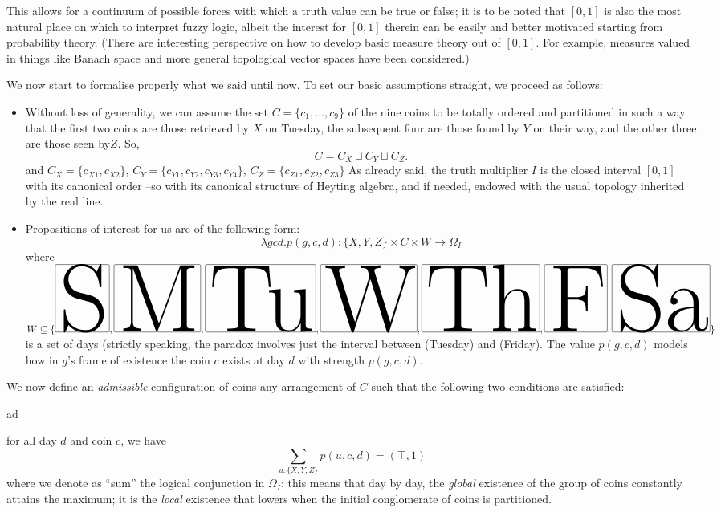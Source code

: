 \begin{example}
\begin{remark}
    This allows for a continuum of possible forces with which a truth value can be true or false;  it is to be noted that $[0,1]$ is also the most natural place on which to interpret fuzzy logic, albeit the interest for $[0,1]$ therein can be easily and better motivated starting from probability theory. (There are interesting perspective on how to develop basic measure theory out of $[0,1]$. For example, measures valued in things like Banach space and more general topological  vector spaces have been considered.)
  \end{remark}
  We now start to formalise properly what we said until now. To set our basic assumptions straight, we proceed as follows:
  \begin{itemize}
    \item Without loss of generality, we can assume the set $C = \{c_1,\dots,c_9\}$ of the nine coins to be totally ordered and partitioned in such a way that the first two coins are those retrieved by $X$ on Tuesday, the subsequent four are those found by $Y$ on their way, and the other three are those seen by$Z$. So,
          \[C = C_X \sqcup C_Y \sqcup C_Z.\]
          and $C_X = \{c_{X1}, c_{X2}\}$, $C_Y = \{c_{Y1},c_{Y2},c_{Y3},c_{Y4}\}$, $C_Z= \{c_{Z1}, c_{Z2}, c_{Z3}\}$ As already said, the truth multiplier $I$ is the closed interval $[0,1]$ with its canonical order --so with its canonical structure of Heyting algebra, and if needed, endowed with the usual topology inherited by the real line.
    \item Propositions of interest for us are of the following form:
          \[\lambda gcd.p(g, c, d) : \{X,Y,Z\}\times C\times W \to \Omega_I\]
          where $W \subseteq \{\S,\M,\Tu,\W, \Th,\F,\Sa\}$ is a set of days (strictly speaking, the paradox involves just the interval between \Tu (Tuesday) and \F (Friday). The value $p(g,c,d)$ models how in $g$'s frame of existence the coin $c$ exists at day $d$ with strength $p(g,c,d)$.
  \end{itemize}
  \begin{definition}
    We now define an \emph{admissible} configuration of coins any arrangement of $C$ such that the following two conditions are satisfied:
    \begin{enumtag}{ad}
      \item \label{ad:uno} for all day $d$ and coin $c$, we have
      \[
        \sum_{u: \{X,Y,Z\}} p(u,c,d) = (\top, 1)
      \]
      where we denote as ``sum'' the logical conjunction in $\Omega_I$: this means that day by day, the \emph{global} existence of the group of coins constantly attains the maximum; it is the \emph{local} existence that lowers when the initial conglomerate of coins is partitioned.

\end{enumtag}
\end{definition}
\end{example}
